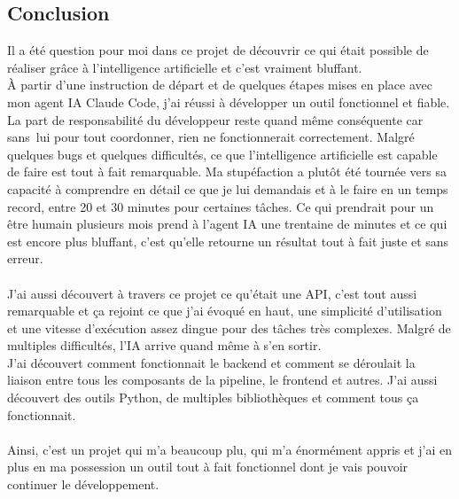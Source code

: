 \documentclass[a4paper, 12pt, twoside]{article}
\begin{document}
	\subsection{Conclusion}
    Il a été question pour moi dans ce projet de découvrir ce qui était possible de réaliser grâce à l’intelligence artificielle et c’est vraiment bluffant. \\
À partir d’une instruction de départ et de quelques étapes mises en place avec mon agent IA Claude Code, j’ai réussi à développer un outil fonctionnel et fiable. La part de responsabilité du développeur reste quand même conséquente car sans lui pour tout coordonner, rien ne fonctionnerait correctement.  Malgré quelques bugs et quelques difficultés, ce que l'intelligence artificielle est capable de faire est tout à fait remarquable. Ma stupéfaction a plutôt été tournée vers sa capacité à comprendre en détail ce que je lui demandais et à le faire en un temps record, entre 20 et 30 minutes pour certaines tâches. Ce qui prendrait pour un être humain plusieurs mois prend à l’agent IA une trentaine de minutes et ce qui est encore plus bluffant, c’est qu’elle retourne un résultat tout à fait juste et sans erreur.\\
\\
J’ai aussi découvert à travers ce projet ce qu’était une API, c’est tout aussi remarquable et ça rejoint ce que j’ai évoqué en haut, une simplicité d’utilisation et une vitesse d’exécution assez dingue pour des tâches très complexes. Malgré de multiples difficultés, l’IA arrive quand même à s’en sortir.\\
J’ai découvert comment fonctionnait le backend et comment se déroulait la liaison entre tous les composants de la pipeline, le frontend et autres. J'ai aussi découvert des outils Python, de multiples bibliothèques et comment tous ça fonctionnait.
\\
\\
Ainsi, c’est un projet qui m’a beaucoup plu, qui m’a énormément appris et j’ai en plus en ma possession un outil tout à fait fonctionnel dont je vais pouvoir continuer le développement.
\end{document}
